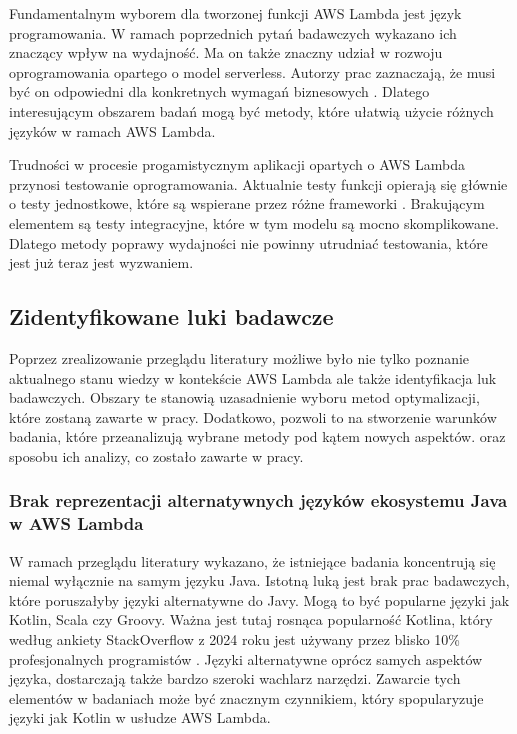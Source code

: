 Fundamentalnym wyborem dla tworzonej funkcji AWS Lambda jest język programowania.
W ramach poprzednich pytań badawczych wykazano ich znaczący wpływ na wydajność.
Ma on także znaczny udział w rozwoju oprogramowania opartego o model serverless.
Autorzy prac zaznaczają, że musi być on odpowiedni dla konkretnych wymagań biznesowych \cite{raza2021sok}\cite{8513710}.
Dlatego interesującym obszarem badań mogą być metody, które ułatwią użycie różnych języków w ramach AWS Lambda.

Trudności w procesie progamistycznym aplikacji opartych o AWS Lambda przynosi testowanie oprogramowania.
Aktualnie testy funkcji opierają się głównie o testy jednostkowe, które są wspierane przez różne frameworki \cite{8605774}.
Brakującym elementem są testy integracyjne, które w tym modelu są mocno skomplikowane.
Dlatego metody poprawy wydajności nie powinny utrudniać testowania, które jest już teraz jest wyzwaniem.

\subsection{Zidentyfikowane luki badawcze}\label{chapter:przeglad_literatury_wyniki_luki}

Poprzez zrealizowanie przeglądu literatury możliwe było nie tylko poznanie aktualnego stanu wiedzy w kontekście AWS Lambda ale także identyfikacja luk badawczych.
Obszary te stanowią uzasadnienie wyboru metod optymalizacji, które zostaną zawarte w pracy.
Dodatkowo, pozwoli to na stworzenie warunków badania, które przeanalizują wybrane metody pod kątem nowych aspektów.
oraz sposobu ich analizy, co zostało zawarte w pracy.

\subsubsection*{Brak reprezentacji alternatywnych języków ekosystemu Java w AWS Lambda}

W ramach przeglądu literatury wykazano, że istniejące badania koncentrują się niemal wyłącznie na samym języku Java.
Istotną luką jest brak prac badawczych, które poruszałyby języki alternatywne do Javy.
Mogą to być popularne języki jak Kotlin, Scala czy Groovy.
Ważna jest tutaj rosnąca popularność Kotlina, który według ankiety StackOverflow z 2024 roku jest używany przez blisko 10\% profesjonalnych programistów \cite{stackoverflow_survey_2024}.
Języki alternatywne oprócz samych aspektów języka, dostarczają także bardzo szeroki wachlarz narzędzi.
Zawarcie tych elementów w badaniach może być znacznym czynnikiem, który spopularyzuje języki jak Kotlin w usłudze AWS Lambda.

